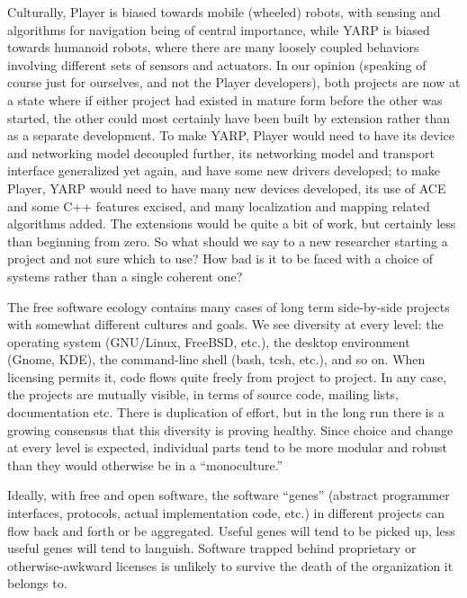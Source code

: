 Culturally, Player is biased towards mobile (wheeled) robots, with
sensing and algorithms for navigation being of central importance,
while YARP is biased towards humanoid robots, where there are many
loosely coupled behaviors involving different sets of sensors and
actuators.
%
In our opinion (speaking of course just for ourselves, and not the
Player developers), both projects are now at a state where if either
project had existed in mature form before the other was started, the
other could most certainly have been built by extension rather than 
as a separate development.
%
To make YARP, Player would need to have its device and networking
model decoupled further, its networking model and transport interface
generalized yet again, and have some new drivers developed; to make
Player, YARP would need to have many new devices developed, its use of
ACE and some C++ features excised, and many localization and mapping
related algorithms added.
%
The extensions would be quite a bit of work, but
certainly less than beginning from zero.
%
So what should we say to a new researcher starting a project and not
sure which to use?
%
How bad is it to be faced with a choice of systems rather than
a single coherent one?

%
%

The free software ecology contains many cases of long term
side-by-side projects with somewhat different cultures and goals.  We
see diversity at every level: the operating system (GNU/Linux,
FreeBSD, etc.), the desktop environment (Gnome, KDE), the command-line
shell (bash, tcsh, etc.), and so on.  When licensing permits it, code
flows quite freely from project to project.  In any case, the projects
are mutually visible, in terms of source code, mailing lists,
documentation etc.  There is duplication of effort, but in the long
run there is a growing consensus that this diversity is proving
healthy.  Since choice and change at every level is expected,
individual parts tend to be more modular and robust than they would
otherwise be in a ``monoculture.''

Ideally, with free and open software, the software ``genes'' (abstract
programmer interfaces, protocols, actual implementation code, etc.)
in different projects can flow back and forth or be aggregated.
Useful genes will tend to be picked up, less useful genes will tend to
languish.  Software trapped behind proprietary or otherwise-awkward
licenses is unlikely to survive the death of the organization it
belongs to.

